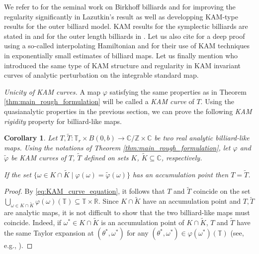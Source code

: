 \documentclass[10pt]{article}
\newtheorem{corollary}[theorem]{Corollary}
\newcommand{\Z}{\mathbb{Z}}
\newcommand{\R}{\mathbb{R}}
\newcommand{\C}{\mathbb{C}}
\newcommand{\T}{\mathbb{T}}
\begin{document}
We refer to \cite{Lazutkin_KAM} for the seminal work on Birkhoff billiards and \cite{Douady} for improving the regularity significantly in Lazutkin's result as well as developping KAM-type results for the outer billiard model. KAM results for the symplectic billiards are stated in \cite{AlbersTabachnikov} and for the outer length billiards in \cite{BBF}. Let us also cite \cite{Popov} for a deep proof using a so-called interpolating Hamiltonian and \cite{MartinRamirezTamarit} for their use of KAM techniques in exponentially small estimates of billiard maps. Let us finally mention \cite{CMS} who introduced the same type of KAM structure and regularity in KAM invariant curves of analytic perturbation on the integrable standard map.

\vspace{0.2cm}
\noindent \textit{Unicity of KAM curves.}  A map $\varphi$ satisfying the same properties as in Theorem \ref{thm:main_rough_formulation} will be called a \textit{KAM curve} of $T$. Using the quasianalytic properties in the previous section, we can prove the following \emph{KAM rigidity} property for billiard-like maps. 

\begin{corollary}
\label{cor:main_uniqueness_rough}
 Let $T, \tilde T : \T_{r}\times B(0, b) \to \C/\Z \times \C$ be two real analytic billiard-like maps. Using the notations of Theorem \ref{thm:main_rough_formulation}, let ${\varphi}$ and $\tilde{\varphi}$ be KAM curves of $T$, $\tilde T$ defined on sets $K$, $\tilde K \subseteq \C$, respectively.%
 
 If the set $\{ \omega \in K \cap \tilde K \mid {\varphi}(\omega) = \tilde {\varphi}(\omega) \}$ has an accumulation point then $T = \tilde T$.
\end{corollary}

\begin{proof}
By \eqref{eq:KAM_curve_equation}, it follows that $T$ and $\tilde T$ coincide on the set $\bigcup_{\omega \in K \cap \tilde K} \varphi(\omega)(\T) \subseteq \T \times \R.$ Since $K \cap \tilde K$ have an accumulation point and $T, \tilde T$ are analytic maps, it is not difficult to show that the two billiard-like maps must coincide. Indeed, if $\omega^* \in K \cap \tilde K$ is an accumulation point of $K \cap \tilde K$, $T$ and $\tilde T$  have the same Taylor expansion at $(\theta^*, \omega^*)$ for any $(\theta^*, \omega^*) \in \varphi (\omega^*)(\T)$ (see, e.g., \cite[Lemma 2.5]{trujillo_uniqueness_2021}). 

\end{proof}
\end{document}
